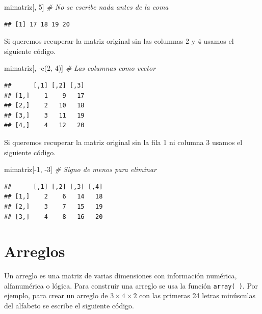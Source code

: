 \documentclass[
]{book}
\makeatletter
\newenvironment{Shaded}{\begin{snugshade}}{\end{snugshade}}
\newcommand{\CommentTok}[1]{\textcolor[rgb]{0.56,0.35,0.01}{\textit{#1}}}
\newcommand{\DecValTok}[1]{\textcolor[rgb]{0.00,0.00,0.81}{#1}}
\newcommand{\FunctionTok}[1]{\textcolor[rgb]{0.00,0.00,0.00}{#1}}
\newcommand{\NormalTok}[1]{#1}
\newcommand{\SpecialCharTok}[1]{\textcolor[rgb]{0.00,0.00,0.00}{#1}}
\newenvironment{kframe}{%
\medskip{}
\setlength{\fboxsep}{.8em}
 \def\at@end@of@kframe{}%
 \ifinner\ifhmode%
  \def\at@end@of@kframe{\end{minipage}}%
  \begin{minipage}{\columnwidth}%
 \fi\fi%
 \def\FrameCommand##1{\hskip\@totalleftmargin \hskip-\fboxsep
 \colorbox{shadecolor}{##1}\hskip-\fboxsep
     \hskip-\linewidth \hskip-\@totalleftmargin \hskip\columnwidth}%
 \MakeFramed {\advance\hsize-\width
   \@totalleftmargin\z@ \linewidth\hsize
   \@setminipage}}%
 {\par\unskip\endMakeFramed%
 \at@end@of@kframe}
\renewenvironment{Shaded}{\begin{kframe}}{\end{kframe}}
\makeatother
\begin{document}
\begin{Shaded}
\begin{Highlighting}[]
\NormalTok{mimatriz[, }\DecValTok{5}\NormalTok{]  }\CommentTok{\# No se escribe nada antes de la coma}
\end{Highlighting}
\end{Shaded}

\begin{verbatim}
## [1] 17 18 19 20
\end{verbatim}

Si queremos recuperar la matriz original sin las columnas 2 y 4 usamos el siguiente código.

\begin{Shaded}
\begin{Highlighting}[]
\NormalTok{mimatriz[, }\SpecialCharTok{{-}}\FunctionTok{c}\NormalTok{(}\DecValTok{2}\NormalTok{, }\DecValTok{4}\NormalTok{)]  }\CommentTok{\# Las columnas como vector}
\end{Highlighting}
\end{Shaded}

\begin{verbatim}
##      [,1] [,2] [,3]
## [1,]    1    9   17
## [2,]    2   10   18
## [3,]    3   11   19
## [4,]    4   12   20
\end{verbatim}

Si queremos recuperar la matriz original sin la fila 1 ni columna 3 usamos el siguiente código.

\begin{Shaded}
\begin{Highlighting}[]
\NormalTok{mimatriz[}\SpecialCharTok{{-}}\DecValTok{1}\NormalTok{, }\SpecialCharTok{{-}}\DecValTok{3}\NormalTok{]  }\CommentTok{\# Signo de menos para eliminar}
\end{Highlighting}
\end{Shaded}

\begin{verbatim}
##      [,1] [,2] [,3] [,4]
## [1,]    2    6   14   18
## [2,]    3    7   15   19
## [3,]    4    8   16   20
\end{verbatim}

\hypertarget{arreglos}{%
\section{\texorpdfstring{Arreglos  }{Arreglos  }}\label{arreglos}}

Un arreglo es una matriz de varias dimensiones con información numérica, alfanumérica o lógica. Para construir una arreglo se usa la función \texttt{array(\ )}. Por ejemplo, para crear un arreglo de \(3 \times 4 \times 2\) con las primeras 24 letras minúsculas del alfabeto se escribe el siguiente código.
\end{document}
